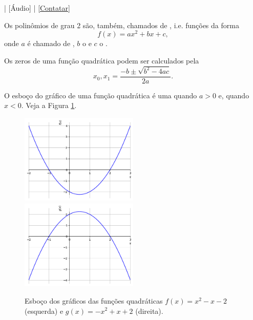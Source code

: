 \begin{flushright}
  [Vídeo] | [Áudio] | \href{https://phkonzen.github.io/notas/contato.html}{[Contatar]}
\end{flushright}

Os polinômios de grau 2 são, também, chamados de , i.e. funções da forma
\begin{equation}
  f(x) = ax^2 + bx + c,
\end{equation}
onde $a$ é chamado de , $b$ o  e $c$ o .

Os zeros de uma função quadrática podem ser calculados pela 
\begin{equation}\label{eq:Bhaskara}
  x_0, x_1 = \frac{-b \pm \sqrt{b^2 - 4ac}}{2a}.
\end{equation}


O esboço do gráfico de uma função quadrática é uma  quando $a > 0$ e,  quando $x < 0$. Veja a Figura \ref{fig:funquad_concavidade}.

\begin{figure}[H]
  \centering
  \includegraphics[width=0.5\textwidth]{./cap_funcao/dados/fig_funquad_concavidade/fig_funquad_concavidade_cima}~
    \includegraphics[width=0.5\textwidth]{./cap_funcao/dados/fig_funquad_concavidade/fig_funquad_concavidade_baixo}
  \caption{Esboço dos gráficos das funções quadráticas $f(x) = x^2-x-2$ (esquerda) e $g(x)=-x^2+x+2$ (direita).}
  \label{fig:funquad_concavidade}
\end{figure}


